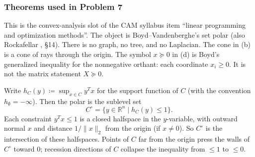 \documentclass[11pt,a4paper]{article}
\begin{document}
\subsubsection{Theorems used in Problem 7}

This is the convex-analysis slot of the CAM syllabus item ``linear programming and optimization methods''. The object is Boyd--Vandenberghe's set polar \cite{boyd04} (also Rockafellar \cite{rockafellar70}, \S14). There is no graph, no tree, and no Laplacian. The cone in (b) is a cone of rays through the origin. The symbol \(x\succeq 0\) in (d) is Boyd's generalized inequality for the nonnegative orthant: each coordinate \(x_{i}\ge 0\). It is not the matrix statement \(X\succeq 0\).

Write \(h_{C}(y)\coloneqq\sup_{x\in C}y^{T}x\) for the support function of \(C\) (with the convention \(h_{\emptyset}=-\infty\)). Then the polar is the sublevel set
\[
C^{\circ}
=
\bigl\{ y\in\mathbb{R}^{n} \mid h_{C}(y)\le 1 \bigr\}.
\]
Each constraint \(y^{T}x\le 1\) is a closed halfspace in the \(y\)-variable, with outward normal \(x\) and distance \(1/\|x\|_{2}\) from the origin (if \(x\neq 0\)). So \(C^{\circ}\) is the intersection of these halfspaces. Points of \(C\) far from the origin press the walls of \(C^{\circ}\) toward \(0\); recession directions of \(C\) collapse the inequality from \(\le 1\) to \(\le 0\).

\begin{center}
\end{center}
\end{document}
